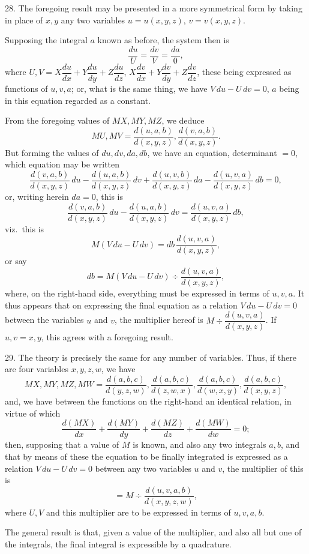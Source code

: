 \documentclass[11pt,a4paper]{article}
\begin{document}
28. The foregoing result may be presented in a more symmetrical form by taking in place of $x, y$ any two variables $u = u(x, y, z)$, $v = v(x, y, z)$.

Supposing the integral $a$ known as before, the system then is
\[
\frac{du}{U} = \frac{dv}{V} = \frac{da}{0},
\]
where $U, V = X\dfrac{du}{dx} + Y\dfrac{du}{dy} + Z\dfrac{du}{dz}$, $X\dfrac{dv}{dx} + Y\dfrac{dv}{dy} + Z\dfrac{dv}{dz}$, these being expressed as functions of $u, v, a$; or, what is the same thing, we have $V\,du - U\,dv = 0$, $a$ being in this equation regarded as a constant.

\newpage


From the foregoing values of $MX, MY, MZ$, we deduce
\[
MU, MV = \frac{d(u, a, b)}{d(x, y, z)}, \frac{d(v, a, b)}{d(x, y, z)}.
\]
But forming the values of $du, dv, da, db$, we have an equation, determinant $= 0$, which equation may be written
\[
\frac{d(v, a, b)}{d(x, y, z)}\,du - \frac{d(u, a, b)}{d(x, y, z)}\,dv + \frac{d(u, v, b)}{d(x, y, z)}\,da - \frac{d(u, v, a)}{d(x, y, z)}\,db = 0,
\]
or, writing herein $da = 0$, this is
\[
\frac{d(v, a, b)}{d(x, y, z)}\,du - \frac{d(u, a, b)}{d(x, y, z)}\,dv = \frac{d(u, v, a)}{d(x, y, z)}\,db,
\]
viz.\ this is
\[
M(V\,du - U\,dv) = db\,\frac{d(u, v, a)}{d(x, y, z)},
\]
or say
\[
db = M(V\,du - U\,dv) \div \frac{d(u, v, a)}{d(x, y, z)},
\]
where, on the right-hand side, everything must be expressed in terms of $u, v, a$. It thus appears that on expressing the final equation as a relation $V\,du - U\,dv = 0$ between the variables $u$ and $v$, the multiplier hereof is $M \div \dfrac{d(u, v, a)}{d(x, y, z)}$. If $u, v = x, y$, this agrees with a foregoing result.

29. The theory is precisely the same for any number of variables. Thus, if there are four variables $x, y, z, w$, we have
\[
MX, MY, MZ, MW = \frac{d(a, b, c)}{d(y, z, w)}, \frac{d(a, b, c)}{d(z, w, x)}, \frac{d(a, b, c)}{d(w, x, y)}, \frac{d(a, b, c)}{d(x, y, z)},
\]
and, we have between the functions on the right-hand an identical relation, in virtue of which
\[
\frac{d(MX)}{dx} + \frac{d(MY)}{dy} + \frac{d(MZ)}{dz} + \frac{d(MW)}{dw} = 0;
\]
then, supposing that a value of $M$ is known, and also any two integrals $a, b$, and that by means of these the equation to be finally integrated is expressed as a relation $V\,du - U\,dv = 0$ between any two variables $u$ and $v$, the multiplier of this is
\[
= M \div \frac{d(u, v, a, b)}{d(x, y, z, w)},
\]
where $U, V$ and this multiplier are to be expressed in terms of $u, v, a, b$.

The general result is that, given a value of the multiplier, and also all but one of the integrals, the final integral is expressible by a quadrature.
\end{document}

